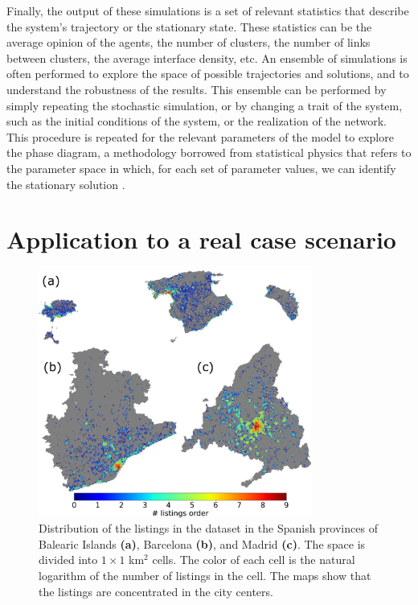 Finally, the output of these simulations is a set of relevant statistics that describe the system's trajectory or the stationary state. These statistics can be the average opinion of the agents, the number of clusters, the number of links between clusters, the average interface density, etc. An ensemble of simulations is often performed to explore the space of possible trajectories and solutions, and to understand the robustness of the results. This ensemble can be performed by simply repeating the stochastic simulation, or by changing a trait of the system, such as the initial conditions of the system, or the realization of the network. This procedure is repeated for the relevant parameters of the model to explore the phase diagram, a methodology borrowed from statistical physics that refers to the parameter space in which, for each set of parameter values, we can identify the stationary solution \cite{goldenfeld-1992}.

\section{\label{sec:Datasets} Application to a real case scenario}

\begin{figure}[ht]
    \centering
    \includegraphics[width=0.80\textwidth]{Figs/Introduction/adds_size_map.pdf}
    \caption[Listings distribution in space]{Distribution of the listings in the dataset in the Spanish provinces of Balearic Islands \textbf{(a)}, Barcelona \textbf{(b)}, and Madrid \textbf{(c)}. The space is divided into $1 \times 1$ km$^2$ cells. The color of each cell is the natural logarithm of the number of listings in the cell. The maps show that the listings are concentrated in the city centers. }
    \label{fig:maps_adds}
\end{figure}

